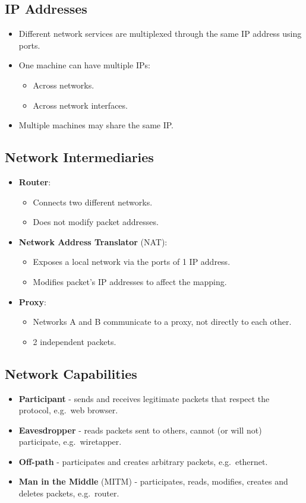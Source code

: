 \documentclass[11pt]{article}
\begin{document}
\subsection{IP Addresses}
\begin{itemize}
  \item Different network services are multiplexed through the same IP address using ports.
  \item One machine can have multiple IPs:
    \begin{itemize}
      \item Across networks.
      \item Across network interfaces.
    \end{itemize}
  \item Multiple machines may share the same IP.
\end{itemize}

\subsection{Network Intermediaries}
\begin{itemize}
  \item \textbf{Router}:
    \begin{itemize}
      \item Connects two different networks.
      \item Does not modify packet addresses.
    \end{itemize}
  \item \textbf{Network Address Translator} (NAT):
    \begin{itemize}
      \item Exposes a local network via the ports of 1 IP address.
      \item Modifies packet's IP addresses to affect the mapping.
    \end{itemize}
  \item \textbf{Proxy}:
    \begin{itemize}
      \item Networks A and B communicate to a proxy, not directly to each other.
      \item 2 independent packets.
    \end{itemize}
\end{itemize}

\subsection{Network Capabilities}
\begin{itemize}
  \item \textbf{Participant} - sends and receives legitimate packets that respect the protocol, e.g.\ web browser.
  \item \textbf{Eavesdropper} - reads packets sent to others, cannot (or will not) participate, e.g.\ wiretapper.
  \item \textbf{Off-path} - participates and creates arbitrary packets, e.g.\ ethernet.
  \item \textbf{Man in the Middle} (MITM) - participates, reads, modifies, creates and deletes packets, e.g.\ router.
\end{itemize}
\end{document}
